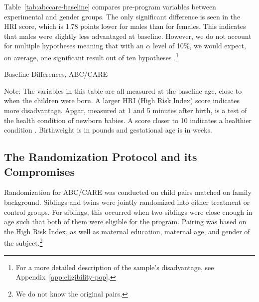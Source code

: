 Table~\ref{tab:abccare-baseline} compares pre-program variables between experimental and gender groups. The only significant difference is seen in the HRI score, which is 1.78 points lower for males than for females. This indicates that males were slightly less advantaged at baseline. However, we do not account for multiple hypotheses meaning that with an $\alpha$ level of 10\%, we would expect, on average, one significant result out of ten hypotheses \citep{Romano_Wolf_2005_JASA}.\footnote{For a more detailed description of the sample's disadvantage, see Appendix~\ref{app:eligibility-pop}.} 

\begin{table}[H]
\centering
\caption{Baseline Differences, ABC/CARE}
\label{tab:abccare-baseline}
\begin{threeparttable}
	
\begin{tablenotes}
\footnotesize
\item Note: The variables in this table are all measured at the baseline age, close to when the children were born. A larger HRI (High Risk Index) score indicates more disadvantage. Apgar, measured at 1 and 5 minutes after birth, is a test of the health condition of newborn babies. A score closer to 10 indicates a healthier condition \citep{Apgar_1966_APGAR-Scoring_PCNA}. Birthweight is in pounds and gestational age is in weeks.
\end{tablenotes}
\end{threeparttable}
\end{table}


\subsection{The Randomization Protocol and its Compromises} \label{section:randomization}

Randomization for ABC/CARE was conducted on child pairs matched on family background. Siblings and twins were jointly randomized into either treatment or control groups. For siblings, this occurred when two siblings were close enough in age such that both of them were eligible for the program. Pairing was based on the High Risk Index, as well as maternal education, maternal age, and gender of the subject.\footnote{We do not know the original pairs.} 

